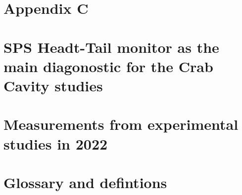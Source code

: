 \documentclass[12pt,twoside]{report} %
\begin{document}
\chapter{Appendix C}\label{ch:app_C}

\chapter{SPS Headt-Tail monitor as the main diagonostic for the Crab Cavity studies}\label{ch:app_HT_monitor}

\chapter{Measurements from experimental studies in 2022}\label{ch:app_measurments_22}


\chapter{Glossary and defintions}


\backmatter
\printbibliography
{}
\end{document}

